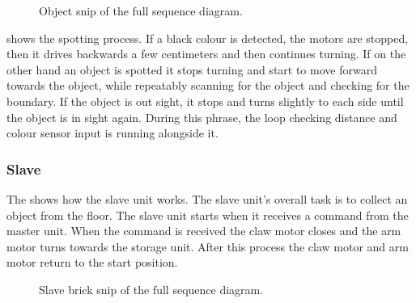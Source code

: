 \begin{figure}[H]
     \caption{\label{fig:sequence-diagram-object-appendix} Object snip of the full sequence diagram.}
\end{figure}

 shows the spotting process. If a black colour is detected, the motors are stopped, then it drives backwards a few centimeters and then continues turning. If on the other hand an object is spotted it stops turning and start to move forward towards the object, while repeatably scanning for the object and checking for the boundary. If the object is out sight, it stops and turns slightly to each side until the object is in sight again. During this phrase, the loop checking distance and colour sensor input is running alongside it. 

\subsubsection{Slave}
The  shows how the slave unit works. The slave unit's overall task is to collect an object from the floor. The slave unit starts when it receives a command from the master unit. When the command is received the claw motor closes and the arm motor turns towards the storage unit. After this process the claw motor and arm motor return to the start position.

\begin{figure}[H]
     \caption{\label{fig:sequence-diagram-slave-appendix} Slave brick snip of the full sequence diagram.}
\end{figure}

